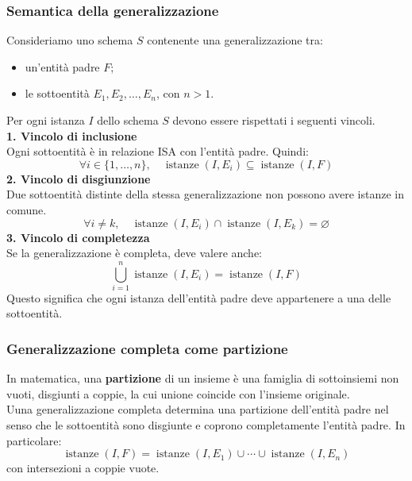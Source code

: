 
\subsubsection*{Semantica della generalizzazione}

Consideriamo uno schema $S$ contenente
una generalizzazione tra:

\begin{itemize}
    \item un'entità padre $F$;
    \item le sottoentità $E_1,E_2,\ldots,E_n$,
    con $n>1$.
\end{itemize}
\noindent
Per ogni istanza $I$ dello schema $S$
devono essere rispettati i seguenti vincoli.\\
\textbf{1. Vincolo di inclusione}\\
Ogni sottoentità è in relazione ISA
con l'entità padre.
Quindi:
\[
\boxed{
\forall i\in\{1,\ldots,n\},
\quad
\operatorname{istanze}(I,E_i)
\subseteq
\operatorname{istanze}(I,F)
}
\]
\textbf{2. Vincolo di disgiunzione}\\
Due sottoentità distinte della stessa
generalizzazione non possono avere
istanze in comune.
\[
\boxed{
\forall i\neq k,
\quad
\operatorname{istanze}(I,E_i)
\cap
\operatorname{istanze}(I,E_k)
=
\varnothing
}
\]
\textbf{3. Vincolo di completezza}\\
Se la generalizzazione è completa,
deve valere anche:
\[
\boxed{
\bigcup_{i=1}^{n}
\operatorname{istanze}(I,E_i)
=
\operatorname{istanze}(I,F)
}
\]
Questo significa che ogni istanza
dell'entità padre deve appartenere
a una delle sottoentità.
\subsubsection*{Generalizzazione completa come partizione}
In matematica, una \textbf{partizione}
di un insieme è una famiglia di sottoinsiemi
non vuoti, disgiunti a coppie,
la cui unione coincide con l'insieme originale.\\
Uuna generalizzazione completa determina una partizione dell'entità padre
nel senso che le sottoentità sono disgiunte
e coprono completamente l'entità padre.
In particolare:
\[
\operatorname{istanze}(I,F)
=
\operatorname{istanze}(I,E_1)
\cup \cdots \cup
\operatorname{istanze}(I,E_n)
\]
con intersezioni a coppie vuote.
